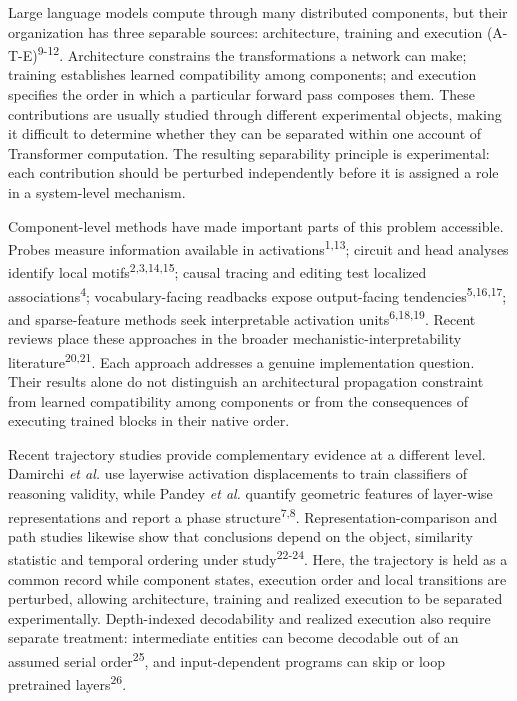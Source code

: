 \documentclass[12pt]{article}
\begin{document}
Large language models compute through many distributed components, but their organization has three separable sources: architecture, training and execution (A-T-E)\textsuperscript{9-12}. Architecture constrains the transformations a network can make; training establishes learned compatibility among components; and execution specifies the order in which a particular forward pass composes them. These contributions are usually studied through different experimental objects, making it difficult to determine whether they can be separated within one account of Transformer computation. The resulting separability principle is experimental: each contribution should be perturbed independently before it is assigned a role in a system-level mechanism.

Component-level methods have made important parts of this problem accessible. Probes measure information available in activations\textsuperscript{1,13}; circuit and head analyses identify local motifs\textsuperscript{2,3,14,15}; causal tracing and editing test localized associations\textsuperscript{4}; vocabulary-facing readbacks expose output-facing tendencies\textsuperscript{5,16,17}; and sparse-feature methods seek interpretable activation units\textsuperscript{6,18,19}. Recent reviews place these approaches in the broader mechanistic-interpretability literature\textsuperscript{20,21}. Each approach addresses a genuine implementation question. Their results alone do not distinguish an architectural propagation constraint from learned compatibility among components or from the consequences of executing trained blocks in their native order.

Recent trajectory studies provide complementary evidence at a different level. Damirchi \emph{et al.} use layerwise activation displacements to train classifiers of reasoning validity, while Pandey \emph{et al.} quantify geometric features of layer-wise representations and report a phase structure\textsuperscript{7,8}. Representation-comparison and path studies likewise show that conclusions depend on the object, similarity statistic and temporal ordering under study\textsuperscript{22-24}. Here, the trajectory is held as a common record while component states, execution order and local transitions are perturbed, allowing architecture, training and realized execution to be separated experimentally. Depth-indexed decodability and realized execution also require separate treatment: intermediate entities can become decodable out of an assumed serial order\textsuperscript{25}, and input-dependent programs can skip or loop pretrained layers\textsuperscript{26}.
\end{document}
